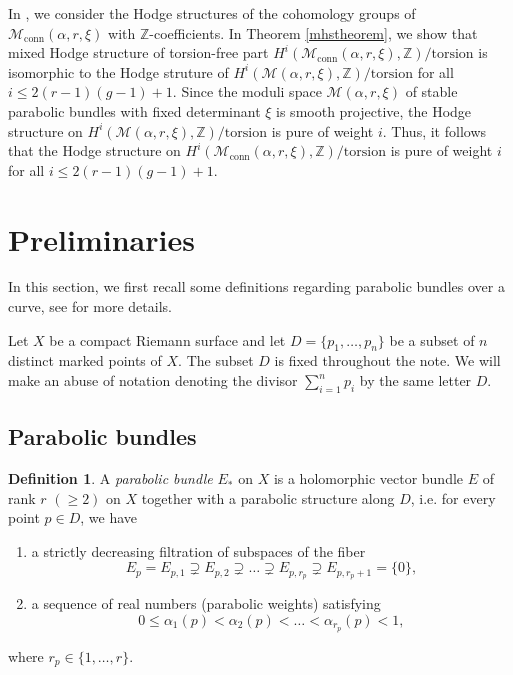 \documentclass[11pt, reqno]{amsart}
\numberwithin{equation}{section}
\theoremstyle{definition}
\newtheorem{definition}{Definition}[section]
\begin{document}
In , we consider the Hodge structures of the cohomology groups of $\mathcal{M}_{\mathrm{conn}}(\alpha, r, \xi)$ with $\mathbb{Z}$-coefficients. In Theorem \ref{mhstheorem}, we show that mixed Hodge structure of torsion-free part $H^i(\mathcal{M}_{\mathrm{conn}}(\alpha, r, \xi),\mathbb{Z})/\mathrm{torsion}$ is isomorphic to the Hodge struture of $H^i(\mathcal{M}(\alpha, r, \xi),\mathbb{Z})/\mathrm{torsion}$ for all $i\leq 2(r-1)(g-1)+1$. Since the moduli space $\mathcal{M}(\alpha, r, \xi)$ of stable parabolic bundles with fixed determinant $\xi$ is smooth projective, the Hodge structure on $H^i(\mathcal{M}(\alpha, r, \xi),\mathbb{Z})/\mathrm{torsion}$ is pure of weight $i$. Thus, it follows that the Hodge structure on  $H^i(\mathcal{M}_{\mathrm{conn}}(\alpha, r, \xi),\mathbb{Z})/\mathrm{torsion}$ is pure of weight $i$ for all $i\leq 2(r-1)(g-1)+1$.
 
\section{Preliminaries}
 In this section, we first recall some definitions regarding parabolic bundles over a curve, see \cite{MY92,MS80} for more details.

 Let $X$ be a compact Riemann surface and let $D = \{p_1,\dots, p_n\} $ be a subset of $n$ distinct marked points of $X$. The subset $D$ is fixed throughout the note. We will make an abuse of notation denoting the divisor $\sum \limits_{i=1}^n p_i$ by the same letter $D$. 
	\subsection{Parabolic bundles}
	\begin{definition}\label{parabolic}
		A \textit{parabolic bundle} $E_*$ on $X$ is a holomorphic vector bundle $E$ of rank $r$ $(\geq 2)$ on $X$ together with a parabolic structure along $D$, i.e. for every point $p \in D$, we have
		\begin{enumerate}
			\item a strictly decreasing filtration of subspaces of the fiber 
			\[
			E_p = E_{p,1}\supsetneq E_{p,2} \supsetneq \dots \supsetneq E_{p,r_p} \supsetneq E_{p,r_p+1} =\{0\},
			\]
			\item a sequence of real numbers (parabolic weights) satisfying 
			\[
			0\leq \alpha_1(p) < \alpha_2(p) < \dots < \alpha_{r_p}(p) < 1,
			\]
		\end{enumerate}
		where $r_p \in \{1,\dots,r\}$. 
	\end{definition}
	
\end{document}
